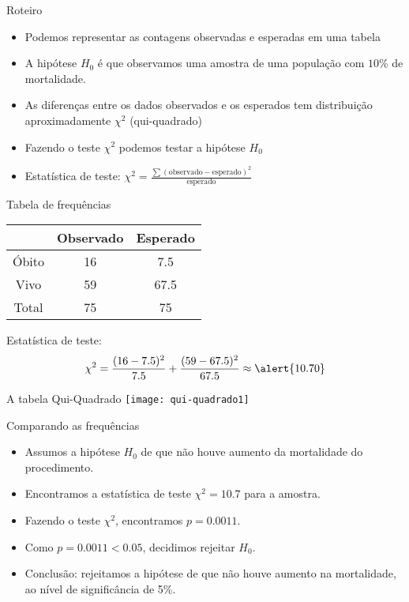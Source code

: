 \documentclass{beamer}
\begin{document}
\begin{frame}{Roteiro}
  \begin{itemize}
  \item Podemos representar as contagens observadas e esperadas em uma tabela
  \item A hipótese $H_0$ é que \alert{observamos uma amostra de uma
      população com $10\%$ de mortalidade}.
  \item As diferenças entre os dados observados e os esperados tem
    distribuição aproximadamente $\chi^2$ (qui-quadrado)
  \item Fazendo o teste $\chi^2$ podemos testar a hipótese $H_0$
  \item Estatística de teste: $\chi^2 = \frac{\sum (\text{observado} - \text{esperado})^2 }{\text{esperado}}$
  \end{itemize}
\end{frame}

\begin{frame}{Tabela de frequências}
  \begin{example}
    \begin{tabular}{c|c|c}
      & Observado & Esperado\\
      \hline
      Óbito & 16 & 7.5 \\
      \hline
      Vivo & 59 & 67.5 \\
      \hline
      Total & 75 & 75\\
    \end{tabular}
  \end{example}

Estatística de teste:
  \begin{displaymath}
    \chi^2 = \frac{(16 - 7.5)^2}{7.5} + \frac{(59 - 67.5)^2}{67.5} \approx \alert{10.70}
  \end{displaymath}
\end{frame}

\begin{frame}{A tabela Qui-Quadrado}
\texttt{[image: qui-quadrado1]}
\end{frame}

\begin{frame}{Comparando as frequências}
  \begin{itemize}
  \item Assumos a hipótese $H_0$ de que não houve aumento da
    mortalidade do procedimento.
  \item Encontramos a estatística de teste $\chi^2 = 10.7$ para a
    amostra.
  \item Fazendo o teste $\chi^2$, encontramos $p=0.0011$.
  \item Como $p=0.0011 < 0.05$, decidimos \alert{rejeitar} $H_0$.
  \item Conclusão: rejeitamos a hipótese de que não houve aumento na
    mortalidade, ao nível de significância de 5\%.
  \end{itemize}
\end{frame}
\end{document}
